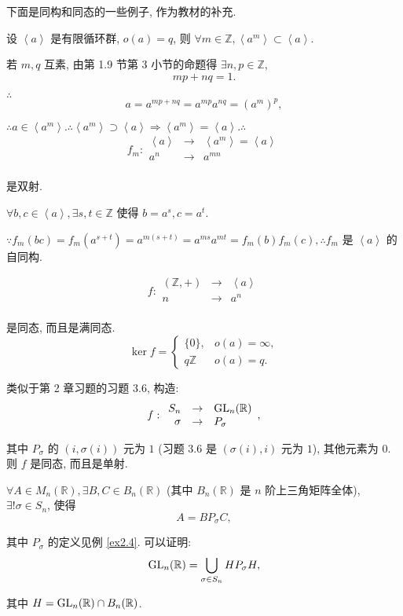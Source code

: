 \documentclass[color=black,device=normal,lang=cn,mode=geye]{elegantnote}
\begin{document}
下面是同构和同态的一些例子, 作为教材的补充.
\begin{example}
    设 $\left<a\right>$ 是有限循环群, $o(a)=q$, 则 $\forall m\in\mathbb{Z},\left<a^m\right>\subset\left<a\right>$.

    若 $m,q$ 互素, 由第 1.9 节第 3 小节的命题得 $\exists n,p\in\mathbb{Z}$,
    \[mp+nq=1.\]

    $\therefore$
    \[a=a^{mp+nq}=a^{mp}a^{nq}=(a^m)^p,\]

    $\therefore a\in\left<a^m\right>.\therefore\left<a^m\right>\supset\left<a\right>\Rightarrow\left<a^m\right>=\left<a\right>.\therefore$
    \[f_m:\begin{array}{rcl}
        \left<a\right> & \to & \left<a^m\right>=\left<a\right> \\
        a^n & \to & a^{mn} \\
    \end{array}\]

    是双射.

    $\forall b,c\in\left<a\right>,\exists s,t\in\mathbb{Z}$ 使得 $b=a^s,c=a^t$.

    $\because f_m(bc)=f_m(a^{s+t})=a^{m(s+t)}=a^{ms}a^{mt}=f_m(b)f_m(c),\therefore f_m$ 是 $\left<a\right>$ 的自同构.
\end{example}
\begin{example}
    \[f:\begin{array}{rcl}
        (\mathbb{Z},+) & \to & \left<a\right> \\
        n & \to & a^n \\
    \end{array}\]
    
    是同态, 而且是满同态.
    \[\ker f=\begin{cases}
        \{0\}, & o(a)=\infty, \\
        q\mathbb{Z} & o(a)=q.
    \end{cases}\]
\end{example}
\begin{example}\label{ex2.4}
    类似于第 2 章习题的习题 3.6, 构造:
    \[f:\begin{array}{rcl}
        S_n & \to & \operatorname{GL} _n(\mathbb{R}) \\
        \sigma & \to & P_\sigma \\
    \end{array},\]

    其中 $P_\sigma$ 的 $(i,\sigma(i))$ 元为 $1$ (习题 3.6 是 $(\sigma(i),i)$ 元为 $1$), 其他元素为 $0$. 则 $f$ 是同态, 而且是单射.

    $\forall A\in M_n(\mathbb{R}),\exists B,C\in B_n(\mathbb{R})$ (其中 $B_n(\mathbb{R})$ 是 $n$ 阶上三角矩阵全体), $\exists!\sigma\in S_n$, 使得
    \[A=BP_\sigma C,\]

    其中 $P_\sigma$ 的定义见例 \ref{ex2.4}. 可以证明:
    \[\operatorname{GL} _n(\mathbb{R})=\bigcup\limits_{\sigma\in S_n}HP_\sigma H,\]

    其中 $H=\operatorname{GL} _n(\mathbb{R})\cap B_n(\mathbb{R})$.
\end{example}
\end{document}

